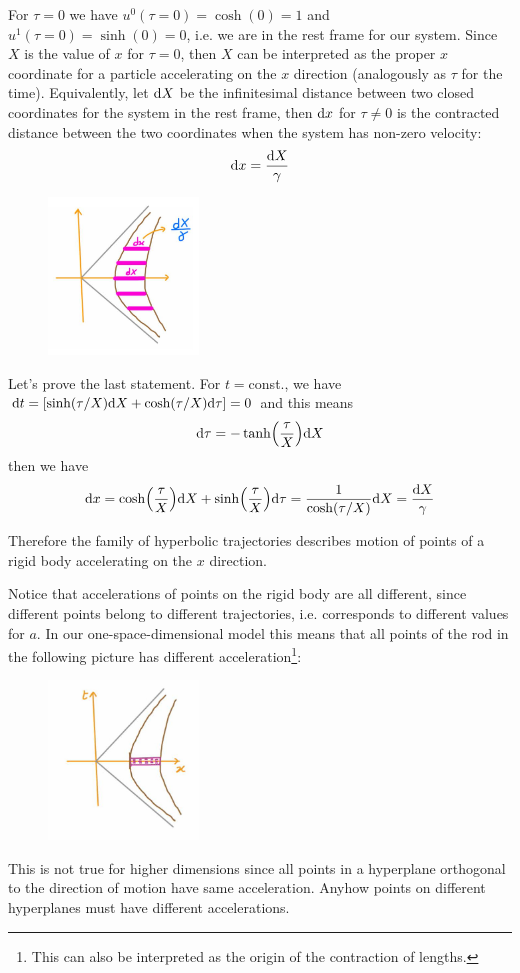 \documentclass[../main/main.tex]{subfiles}
\begin{document}
For $\tau=0$ we have $u^0(\tau=0)=\cosh(0)=1$ and $u^1(\tau=0)=\sinh(0)=0$, i.e. we are in the rest frame for our system. Since $X$ is the value of $x$ for $\tau=0$, then $X$ can be interpreted as the proper $x$ coordinate for a particle accelerating on the $x$ direction (analogously as $\tau$ for the time). Equivalently, let $\textup{d} X$ be the infinitesimal distance between two closed coordinates for the system in the rest frame, then $\textup{d} x$ for $\tau\neq0$ is the contracted distance between the two coordinates when the system has non-zero velocity:
\[\textup{d} x=\frac{\textup{d} X}\gamma\]
\begin{figure}[H]
\centering
\includegraphics[width=4cm]{../img/X-proper-lenght-Rindler.jpg}
\end{figure}
Let's prove the last statement. For $t=$const., we have $\textup{d} t=[\sinh(\tau/X)\textup{d} X+\cosh(\tau/X)\textup{d}\tau]=0$ and this means
\[\textup{d}\tau=-\tanh(\frac\tau X)\textup{d} X\]
then we have
\[\textup{d} x=\cosh(\frac\tau X)\textup{d} X+\sinh(\frac\tau X)\textup{d}\tau=\frac1{\cosh(\tau/X)}\textup{d} X=\frac{\textup{d} X}\gamma\]

Therefore the family of hyperbolic trajectories describes motion of points of a rigid body accelerating on the $x$ direction. 

Notice that accelerations of points on the rigid body are all different, since different points belong to different trajectories, i.e. corresponds to different values for $a$. In our one-space-dimensional model this means that all points of the rod in the following picture has different acceleration\footnote{This can also be interpreted as the origin of the contraction of lengths.}:
\begin{figure}[H]
\centering
\includegraphics[width=4cm]{../img/acceleration-points-rigid-body.jpg}
\end{figure}
This is not true for higher dimensions since all points in a hyperplane orthogonal to the direction of motion have same acceleration. Anyhow points on different hyperplanes must have different accelerations.
\end{document}
